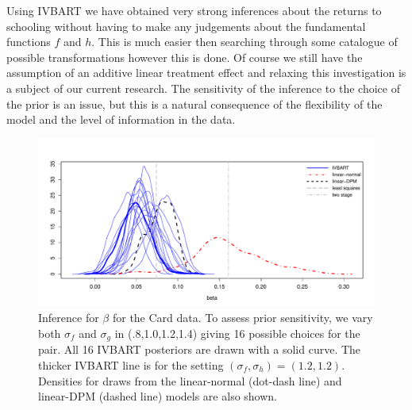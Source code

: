 Using IVBART we have obtained very strong inferences about the returns to schooling without having
to make any judgements about the fundamental functions $f$ and $h$.
This is much easier then searching through some catalogue of possible transformations however this is done.
Of course we still have the assumption of an additive linear treatment effect and relaxing this investigation
is a subject of our current research.
The sensitivity of the inference to the choice of the prior is an issue, but this is a natural consequence
of the flexibility of the model and the level of information in the data.


\begin{figure}
\centerline{\includegraphics[scale=.6]{card-ivbart-2w-sens-1.pdf}}
\caption{%
Inference for $\beta$ for the Card data.
To assess prior sensitivity, we vary both $\sigma_f$ and $\sigma_g$ 
in (.8,1.0,1.2,1.4) giving 16 possible choices for the pair.
All 16 IVBART posteriors are drawn with a solid curve.
The thicker IVBART line is for the setting $(\sigma_f,\sigma_h) = (1.2,1.2)$.
Densities
for draws from the linear-normal (dot-dash line) and linear-DPM (dashed line) models are
also shown.
\label{fig:card-data-2w-sens-1}}
\end{figure}

